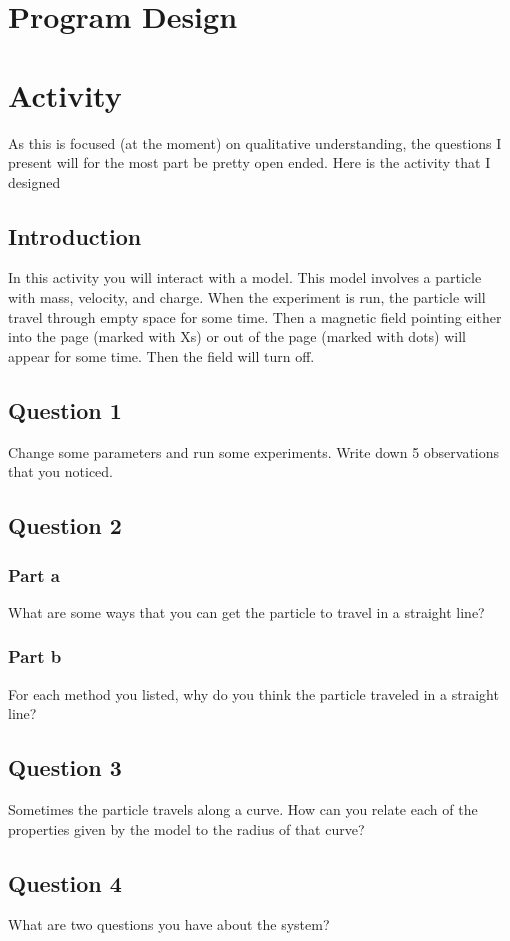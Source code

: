 \documentclass[11pt]{article}
\begin{document}
   	    \section*{Program Design}
   	    
   	    \section*{Activity}
   	    
   	    As this is focused (at the moment) on qualitative understanding, the questions I present will for the most part be pretty open ended. Here is the activity that I designed
   	    
   	    \subsection*{Introduction}
   	    
   	    	In this activity you will interact with a model. This model involves a particle with mass, velocity, and charge. When the experiment is run, the particle will travel through empty space for some time. Then a magnetic field pointing either into the page (marked with Xs) or out of the page (marked with dots) will appear for some time. Then the field will turn off.
   	    
   	    \subsection*{Question 1}
			Change some parameters and run some experiments. Write down 5 observations that you noticed.
			
		\subsection*{Question 2}
			\subsubsection*{Part a}
				What are some ways that you can get the particle to travel in a straight line?
				
			\subsubsection*{Part b}
				For each method you listed, why do you think the particle traveled in a straight line?
			
		\subsection*{Question 3}
			Sometimes the particle travels along a curve. How can you relate each of the properties given by the model to the radius of that curve?
			
		\subsection*{Question 4}
			What are two questions you have about the system?
\end{document}
